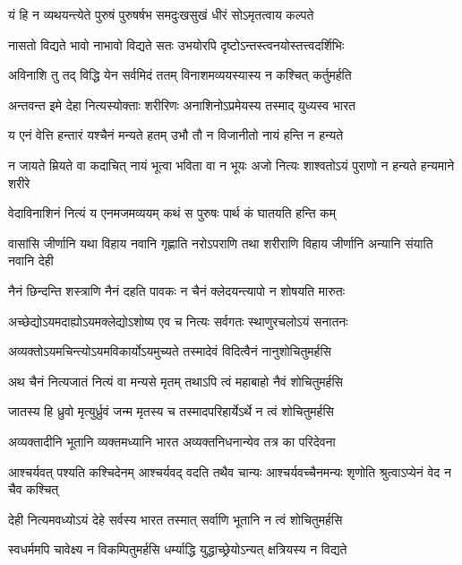 \twolineshloka
{यं हि न व्यथयन्त्येते पुरुषं पुरुषर्षभ}
{समदुःखसुखं धीरं सोऽमृतत्वाय कल्पते}%

\twolineshloka
{नासतो विद्यते भावो नाभावो विद्यते सतः}
{उभयोरपि दृष्टोऽन्तस्त्वनयोस्तत्त्वदर्शिभिः}%

\twolineshloka
{अविनाशि तु तद् विद्धि येन सर्वमिदं ततम्}
{विनाशमव्ययस्यास्य न कश्चित् कर्तुमर्हति}%

\twolineshloka
{अन्तवन्त इमे देहा नित्यस्योक्ताः शरीरिणः}
{अनाशिनोऽप्रमेयस्य तस्माद् युध्यस्व भारत}%

\twolineshloka
{य एनं वेत्ति हन्तारं यश्चैनं मन्यते हतम्}
{उभौ तौ न विजानीतो नायं हन्ति न हन्यते}%

\fourlineindentedshloka
{न जायते म्रियते वा कदाचित्}
{नायं भूत्वा भविता वा न भूयः}
{अजो नित्यः शाश्वतोऽयं पुराणो}
{न हन्यते हन्यमाने शरीरे}%

\twolineshloka
{वेदाविनाशिनं नित्यं य एनमजमव्ययम्}
{कथं स पुरुषः पार्थ कं घातयति हन्ति कम्}%

\fourlineindentedshloka
{वासांसि जीर्णानि यथा विहाय}
{नवानि गृह्णाति नरोऽपराणि}
{तथा शरीराणि विहाय जीर्णानि}
{अन्यानि संयाति नवानि देही}%

\twolineshloka
{नैनं छिन्दन्ति शस्त्राणि नैनं दहति पावकः}
{न चैनं क्लेदयन्त्यापो न शोषयति मारुतः}%

\twolineshloka
{अच्छेद्योऽयमदाह्योऽयमक्लेद्योऽशोष्य एव च}
{नित्यः सर्वगतः स्थाणुरचलोऽयं सनातनः}%

\twolineshloka
{अव्यक्तोऽयमचिन्त्योऽयमविकार्योऽयमुच्यते}
{तस्मादेवं विदित्वैनं नानुशोचितुमर्हसि}%

\twolineshloka
{अथ चैनं नित्यजातं नित्यं वा मन्यसे मृतम्}
{तथाऽपि त्वं महाबाहो नैवं शोचितुमर्हसि}%

\twolineshloka
{जातस्य हि ध्रुवो मृत्युर्ध्रुवं जन्म मृतस्य च}
{तस्मादपरिहार्येऽर्थे न त्वं शोचितुमर्हसि}%

\twolineshloka
{अव्यक्तादीनि भूतानि व्यक्तमध्यानि भारत}
{अव्यक्तनिधनान्येव तत्र का परिदेवना}%

\fourlineindentedshloka
{आश्चर्यवत् पश्यति कश्चिदेनम्}
{आश्चर्यवद् वदति तथैव चान्यः}
{आश्चर्यवच्चैनमन्यः शृणोति}
{श्रुत्वाऽप्येनं वेद न चैव कश्चित्}%

\twolineshloka
{देही नित्यमवध्योऽयं देहे सर्वस्य भारत}
{तस्मात् सर्वाणि भूतानि न त्वं शोचितुमर्हसि}%

\twolineshloka
{स्वधर्ममपि चावेक्ष्य न विकम्पितुमर्हसि}
{धर्म्याद्धि युद्धाच्छ्रेयोऽन्यत् क्षत्रियस्य न विद्यते}%

